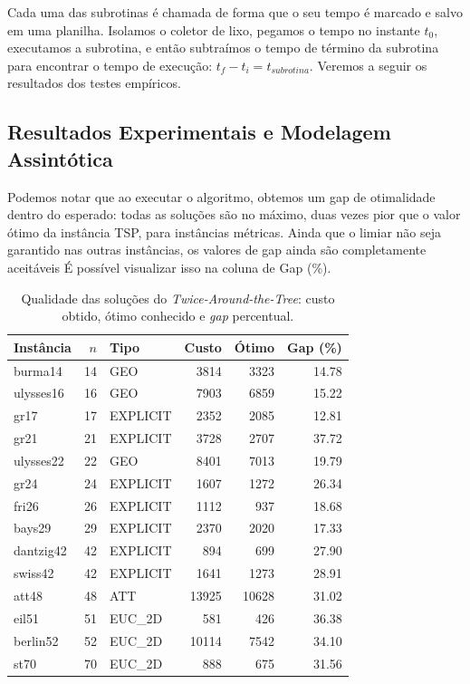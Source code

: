 \documentclass[12pt]{article}
\begin{document}
Cada uma das subrotinas é chamada de forma que o seu tempo é marcado e salvo em uma planilha. Isolamos o coletor de lixo, pegamos o tempo no instante $t_0$, executamos a subrotina, e então subtraímos o tempo de término da subrotina para encontrar o tempo de execução: $t_f - t_i = t_{subrotina}$. Veremos a seguir os resultados dos testes empíricos.

\subsection{Resultados Experimentais e Modelagem Assintótica}
Podemos notar que ao executar o algoritmo, obtemos um gap de otimalidade dentro do esperado: todas as soluções são no máximo, duas vezes pior que o valor ótimo da instância TSP, para instâncias métricas. Ainda que o limiar não seja garantido nas outras instâncias, os valores de gap ainda são completamente aceitáveis É possível visualizar isso na coluna de Gap (\%).
\begin{table}[H]
\centering
\label{tab:twice-qualidade}
\begin{tabular}{l|r|l|r|r|r}
\toprule
Instância & $n$ & Tipo & Custo & Ótimo & Gap (\%) \\
\hline

\midrule
burma14 & 14 & GEO & 3814 & 3323 & 14.78 \\
ulysses16 & 16 & GEO & 7903 & 6859 & 15.22 \\
gr17 & 17 & EXPLICIT & 2352 & 2085 & 12.81 \\
gr21 & 21 & EXPLICIT & 3728 & 2707 & 37.72 \\
ulysses22 & 22 & GEO & 8401 & 7013 & 19.79 \\
gr24 & 24 & EXPLICIT & 1607 & 1272 & 26.34 \\
fri26 & 26 & EXPLICIT & 1112 & 937 & 18.68 \\
bays29 & 29 & EXPLICIT & 2370 & 2020 & 17.33 \\
dantzig42 & 42 & EXPLICIT & 894 & 699 & 27.90 \\
swiss42 & 42 & EXPLICIT & 1641 & 1273 & 28.91 \\
att48 & 48 & ATT & 13925 & 10628 & 31.02 \\
eil51 & 51 & EUC\_2D & 581 & 426 & 36.38 \\
berlin52 & 52 & EUC\_2D & 10114 & 7542 & 34.10 \\
st70 & 70 & EUC\_2D & 888 & 675 & 31.56 \\
\bottomrule
\end{tabular}
\caption{Qualidade das soluções do \textit{Twice-Around-the-Tree}: custo obtido, ótimo conhecido e \textit{gap} percentual.}
\end{table}
\end{document}
